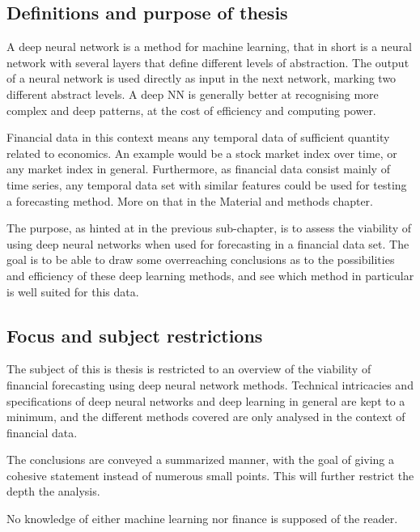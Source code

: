 \subsection{Definitions and purpose of thesis}


A deep neural network is a method for machine learning, that in short is a neural network with several layers that define different levels of abstraction. The output of a neural network is used directly as input in the next network, marking two different abstract levels. A deep NN is generally better at recognising more complex and deep patterns, at the cost of efficiency and computing power.

Financial data in this context means any temporal data of sufficient quantity related to economics. An example would be a stock market index over time, or any market index in general. Furthermore, as financial data consist mainly of time series, any temporal data set with similar features could be used for testing a forecasting method. More on that in the Material and methods chapter.

The purpose, as hinted at in the previous sub-chapter, is to assess the viability of using deep neural networks when used for forecasting in a financial data set. The goal is to be able to draw some overreaching conclusions as to the possibilities and efficiency of these deep learning methods, and see which method in particular is well suited for this data.

\subsection{Focus and subject restrictions}

The subject of this is thesis is restricted to an overview of the viability of financial forecasting using deep neural network methods. Technical intricacies and specifications of deep neural networks and deep learning in general are kept to a minimum, and the different methods covered are only analysed in the context of financial data.

The conclusions are conveyed a summarized manner, with the goal of giving a cohesive statement instead of numerous small points. This will further restrict the depth the analysis.

No knowledge of either machine learning nor finance is supposed of the reader.




